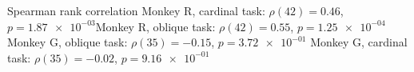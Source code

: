 Spearman rank correlation Monkey R, cardinal task: $\rho(42) = 0.46$, $p = \num{1.87e-03}$Monkey R, oblique task: $\rho(42) = 0.55$, $p = \num{1.25e-04}$ Monkey G, oblique task: $\rho(35) = -0.15$, $p = \num{3.72e-01}$ Monkey G, cardinal task: $\rho(35) = -0.02$, $p = \num{9.16e-01}$